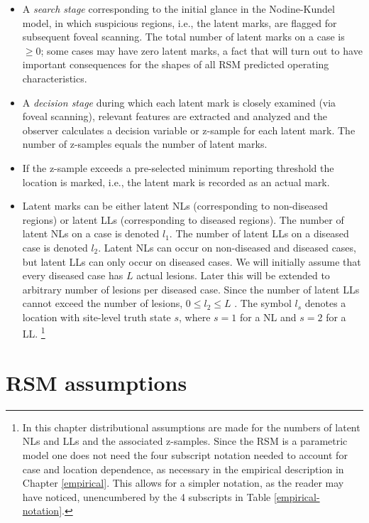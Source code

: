 \documentclass[
]{book}
\begin{document}
\begin{itemize}
\item
  A \emph{search stage} corresponding to the initial glance in the Nodine-Kundel model, in which suspicious regions, i.e., the latent marks, are flagged for subsequent foveal scanning. The total number of latent marks on a case is \(\geq 0\); some cases may have zero latent marks, a fact that will turn out to have important consequences for the shapes of all RSM predicted operating characteristics.
\item
  A \emph{decision stage} during which each latent mark is closely examined (via foveal scanning), relevant features are extracted and analyzed and the observer calculates a decision variable or z-sample for each latent mark. The number of z-samples equals the number of latent marks.
\item
  If the z-sample exceeds a pre-selected minimum reporting threshold the location is marked, i.e., the latent mark is recorded as an actual mark.
\item
  Latent marks can be either latent NLs (corresponding to non-diseased regions) or latent LLs (corresponding to diseased regions). The number of latent NLs on a case is denoted \(l_1\). The number of latent LLs on a diseased case is denoted \(l_2\). Latent NLs can occur on non-diseased and diseased cases, but latent LLs can only occur on diseased cases. We will initially assume that every diseased case has \(L\) actual lesions. Later this will be extended to arbitrary number of lesions per diseased case. Since the number of latent LLs cannot exceed the number of lesions, \(0 \leq l_2 \leq L\) . The symbol \(l_s\) denotes a location with site-level truth state \(s\), where \(s = 1\) for a NL and \(s = 2\) for a LL. \footnote{In this chapter distributional assumptions are made for the numbers of latent NLs and LLs and the associated z-samples. Since the RSM is a parametric model one does not need the four subscript notation needed to account for case and location dependence, as necessary in the empirical description in Chapter \ref{empirical}. This allows for a simpler notation, as the reader may have noticed, unencumbered by the 4 subscripts in Table \ref{empirical-notation}.}
\end{itemize}

\hypertarget{rsm-assumptions}{%
\section{RSM assumptions}\label{rsm-assumptions}}
\end{document}
